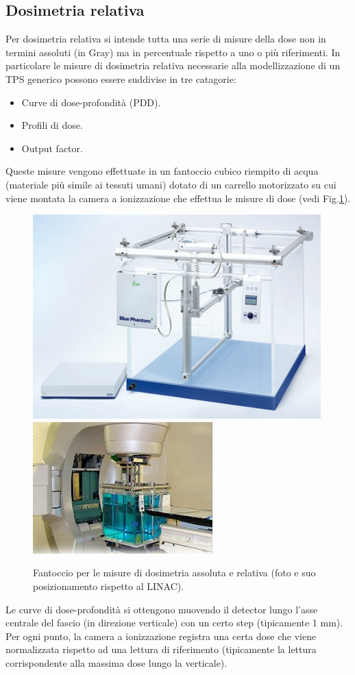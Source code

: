 \subsection{Dosimetria relativa}
\label{sec:dos_rel}
Per dosimetria relativa si intende tutta una serie di misure della dose non in termini assoluti (in Gray) ma in percentuale rispetto a uno o più riferimenti. In particolare le misure di dosimetria relativa necessarie alla modellizzazione di un TPS generico possono essere suddivise in tre catagorie:
\begin{itemize}
\item Curve di dose-profondità (PDD).
\item Profili di dose.
\item Output factor.
\end{itemize}
Queste misure vengono effettuate in un fantoccio cubico riempito di acqua (materiale più simile ai tessuti umani) dotato di un carrello motorizzato su cui viene montata la camera a ionizzazione che effettua le misure di dose (vedi Fig.\ref{fig:wphant}).
\begin{figure}[!t]
\centering
\includegraphics[width=.45\textwidth]{./cap2/wphant.jpg}
\includegraphics[width=.45\textwidth]{./cap2/wphant_pos.jpg}
\caption{Fantoccio per le misure di dosimetria assoluta e relativa (foto e suo posizionamento rispetto al LINAC).}
\label{fig:wphant}
\end{figure}

Le curve di dose-profondità si ottengono muovendo il detector lungo l'asse centrale del fascio (in direzione verticale) con un certo step (tipicamente 1 mm).\\
Per ogni punto, la camera a ionizzazione registra una certa dose che viene normalizzata rispetto ad una lettura di riferimento (tipicamente la lettura corrispondente alla massima dose lungo la verticale).

